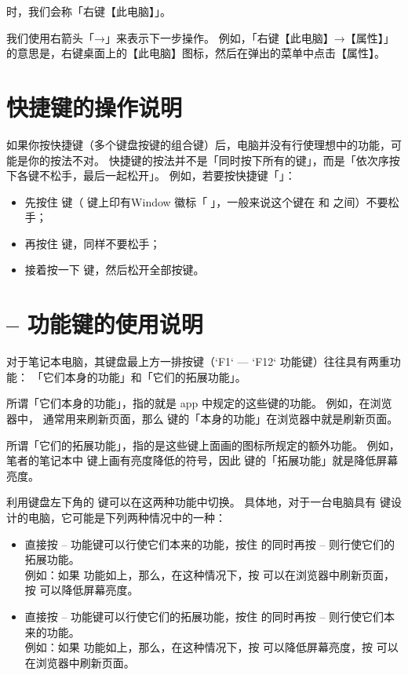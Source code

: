 \documentclass[a4paper,x11names]{book}
\begin{document}
\noindent 时，我们会称「右键【此电脑】」。

我们使用右箭头「→」来表示下一步操作。
例如，「右键【此电脑】→【属性】」的意思是，右键桌面上的【此电脑】图标，然后在弹出的菜单中点击【属性】。

\section{快捷键的操作说明}

如果你按快捷键（多个键盘按键的组合键）后，电脑并没有行使理想中的功能，可能是你的按法不对。
快捷键的按法并不是「同时按下所有的键」，而是「依次序按下各键不松手，最后一起松开」。
例如，若要按快捷键「」：

\begin{itemize}
  \item 先按住  键（ 键上印有Window 徽标「」，一般来说这个键在  和  之间）不要松手；
  \item 再按住  键，同样不要松手；
  \item 接着按一下  键，然后松开全部按键。
\end{itemize}

\section{ --  功能键的使用说明}

对于笔记本电脑，其键盘最上方一排按键（`F1` — `F12` 功能键）往往具有两重功能：
「它们本身的功能」和「它们的拓展功能」。

所谓「它们本身的功能」，指的就是 app 中规定的这些键的功能。
例如，在浏览器中， 通常用来刷新页面，那么  键的「本身的功能」在浏览器中就是刷新页面。

所谓「它们的拓展功能」，指的是这些键上面画的图标所规定的额外功能。
例如，笔者的笔记本中  键上画有亮度降低的符号，因此  键的「拓展功能」就是降低屏幕亮度。

利用键盘左下角的  键可以在这两种功能中切换。
具体地，对于一台电脑具有  键设计的电脑，它可能是下列两种情况中的一种：

\begin{itemize}
  \item 直接按  --  功能键可以行使它们本来的功能，按住  的同时再按  --  则行使它们的拓展功能。\\
    例如：如果  功能如上，那么，在这种情况下，按  可以在浏览器中刷新页面，按  可以降低屏幕亮度。
  \item 直接按  --  功能键可以行使它们的拓展功能，按住  的同时再按  --  则行使它们本来的功能。\\
    例如：如果  功能如上，那么，在这种情况下，按  可以降低屏幕亮度，按  可以在浏览器中刷新页面。
\end{itemize}
\end{document}
